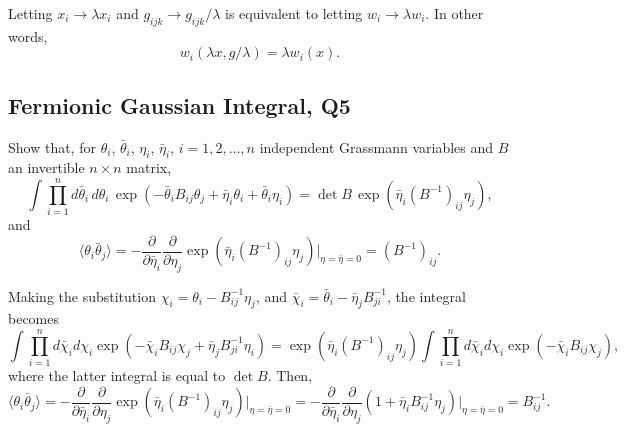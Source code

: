 \begin{solution}
Letting $x_i \to \lambda x_i$ and $g_{ijk}\to g_{ijk}/\lambda$ is equivalent to letting $w_i\to \lambda w_i$. In other words,
\begin{equation}
    w_i(\lambda x, g/\lambda) = \lambda w_i(x).
\end{equation}


\end{solution}

\subsection{Fermionic Gaussian Integral, Q5}

Show that, for $\theta_i$, $\bar\theta_i$, $\eta_i$, $\bar\eta_i$, $i=1,2,\ldots,n$ independent Grassmann variables and $B$ an invertible $n\times n$ matrix,
\begin{equation}
    \int\prod_{i=1}^n d\bar\theta_i\,d\theta_i\,\exp\!\left(-\bar\theta_i B_{ij}\theta_j + \bar\eta_i\theta_i + \bar\theta_i\eta_i\right) = \det B\,\exp\!\left(\bar\eta_i(B^{-1})_{ij}\eta_j\right),
\end{equation}
and
\begin{equation}
    \langle\theta_i\bar\theta_j\rangle = -\frac{\partial}{\partial\bar\eta_i}\frac{\partial}{\partial\eta_j}\exp\!\left(\bar\eta_i(B^{-1})_{ij}\eta_j\right)\bigg|_{\eta=\bar\eta=0} = (B^{-1})_{ij}.
\end{equation}

\begin{solution}
    Making the substitution $\chi_i = \theta_i -B_{ij}^{-1}\eta_j$, and $\bar\chi_i = \bar\theta_i - \bar\eta_jB_{ji}^{-1}$, the integral becomes
    \begin{equation}
        \int\prod_{i=1}^nd\bar\chi_id\chi_i \exp\left(-\bar\chi_i B_{ij}\chi_j + \bar\eta_jB_{ji}^{-1}\eta_i\right) = \exp\!\left(\bar\eta_i(B^{-1})_{ij}\eta_j\right)\int\prod_{i=1}^nd\bar\chi_id\chi_i \exp\left(-\bar\chi_i B_{ij}\chi_j\right),
    \end{equation}
    where the latter integral is equal to $\det B$. Then,
    \begin{equation}
        \langle \theta_i \bar\theta_j\rangle = - \frac{\partial}{\partial\bar\eta_i}\frac{\partial}{\partial\eta_j}\exp\!\left(\bar\eta_i(B^{-1})_{ij}\eta_j\right)\bigg|_{\eta=\bar\eta=0} =- \frac{\partial}{\partial\bar\eta_i}\frac{\partial}{\partial\eta_j}(1+\bar\eta_iB_{ij}^{-1}\eta_j)\bigg|_{\eta=\bar\eta=0} = B_{ij}^{-1}.
    \end{equation}
\end{solution}


